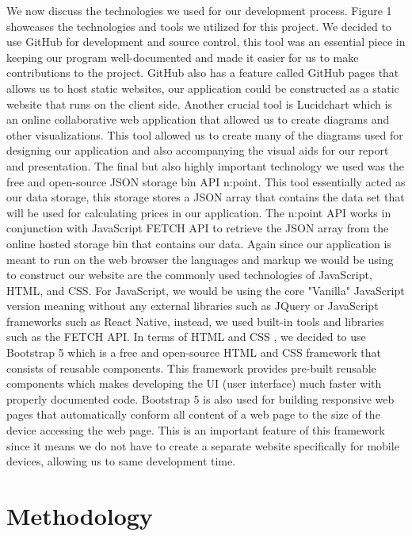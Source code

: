 \documentclass[12pt]{article}
\begin{document}
\noindent We now discuss the technologies we used for our development process. Figure 1 showcases the technologies and tools we utilized for this project. We decided to use GitHub for development and source control, this tool was an essential piece in keeping our program well-documented and made it easier for us to make contributions to the project. GitHub also has a feature called GitHub pages that allows us to host static websites, our application could be constructed as a static website that runs on the client side. Another crucial tool is Lucidchart which is an online collaborative web application that allowed us to create diagrams and other visualizations. This tool allowed us to create many of the diagrams used for designing our application and also accompanying the visual aids for our report and presentation. The final but also highly important technology we used was the free and open-source JSON storage bin API n:point\cite{npoint.io}. This tool essentially acted as our data storage, this storage stores a JSON array that contains the data set that will be used for calculating prices in our application. The n:point API works in conjunction with JavaScript FETCH API \cite{APIs} to retrieve the JSON array from the online hosted storage bin that contains our data. Again since our application is meant to run on the web browser the languages and markup we would be using to construct our website are the commonly used technologies of JavaScript, HTML, and CSS. For JavaScript, we would be using the core "Vanilla" JavaScript \cite{JS} version meaning without any external libraries such as JQuery or JavaScript frameworks such as React Native, instead, we used built-in tools and libraries such as the FETCH API\cite{web}. In terms of HTML \cite{HTML} and CSS \cite{CSS}, we decided to use Bootstrap 5 which is a free and open-source HTML and CSS framework that consists of reusable components\cite{thornton_otto}. This framework provides pre-built reusable components which makes developing the UI (user interface) much faster with properly documented code. Bootstrap 5 is also used for building responsive web pages that automatically conform all content of a web page to the size of the device accessing the web page. This is an important feature of this framework since it means we do not have to create a separate website specifically for mobile devices, allowing us to same development time. 

\section{Methodology}
\end{document}

